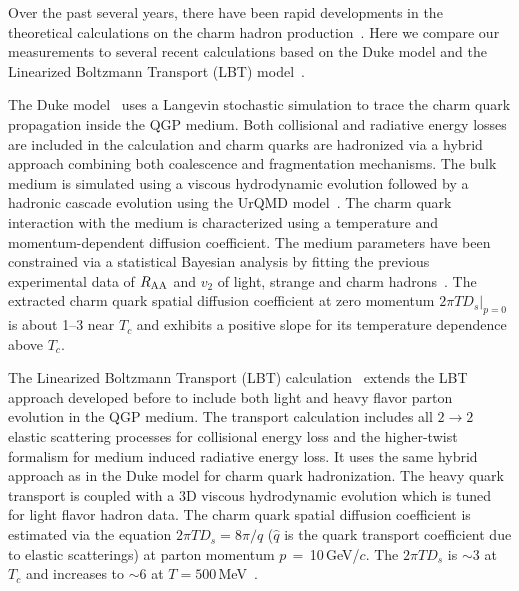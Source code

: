 \documentclass[%
 reprint,	
showpacs,
 amsmath,amssymb,
 aps,
 prc,
]{revtex4-1}
\providecommand{\DIFaddtex}[1]{{\protect\color{blue}\uwave{#1}}} %
\providecommand{\DIFaddbegin}{} %
\providecommand{\DIFaddend}{} %
\providecommand{\DIFadd}[1]{\texorpdfstring{\DIFaddtex{#1}}{#1}} %
\begin{document}
Over the past several years, there have been rapid developments in the theoretical calculations on the charm hadron production~\cite{Rapp:2018qla,Cao:2018ews}. Here we compare our measurements to several recent calculations based on the Duke model and the Linearized Boltzmann Transport (LBT) model~\cite{Cao:2016gvr,LBT:private,Xu:2017obm}.

The Duke model~\cite{Duke,Xu:2017obm} uses a Langevin stochastic simulation to trace the charm quark propagation inside the QGP medium. Both collisional and radiative energy losses are included in the calculation and charm quarks are hadronized via a hybrid approach combining both coalescence and fragmentation mechanisms. The bulk medium is simulated using a viscous hydrodynamic evolution followed by a hadronic cascade evolution using the UrQMD model~\cite{urQMD}. The charm quark interaction with the medium is characterized using a temperature and momentum-dependent diffusion coefficient. The medium parameters have been constrained via a statistical Bayesian analysis by fitting the previous experimental data of $R_{\rm AA}$ and $v_{2}$ of light, strange and charm hadrons~\cite{Xu:2017obm}. The extracted charm quark spatial diffusion coefficient at zero momentum $2\pi TD_s|_{p=0}$ is about 1--3 near $T_{c}$ and exhibits a positive slope for its temperature dependence above $T_{c}$.

The Linearized Boltzmann Transport (LBT) calculation~\cite{Cao:2016gvr} extends the LBT approach developed before to include both light and heavy flavor parton evolution in the QGP medium. The transport calculation includes all $2\rightarrow 2$ elastic scattering processes for collisional energy loss and the higher-twist formalism for medium induced radiative energy loss. It uses the same hybrid approach as in the Duke model for charm quark hadronization. The heavy quark transport is coupled with a 3D viscous hydrodynamic evolution which is tuned for light flavor hadron data. The charm quark spatial diffusion coefficient is estimated via the equation $2\pi TD_s =8\pi/\hat{q}$ ($\hat{q}$ is the quark transport coefficient due to elastic scatterings) at parton momentum $p$\,$=$\,10\,GeV/$c$. The $2\pi TD_s$ is $\sim$\DIFaddbegin \DIFadd{\,}\DIFaddend 3 at $T_{c}$ and increases to $\sim$\DIFaddbegin \DIFadd{\,}\DIFaddend 6 at $T = 500$\,MeV~\cite{LBT:private}.
\end{document}
